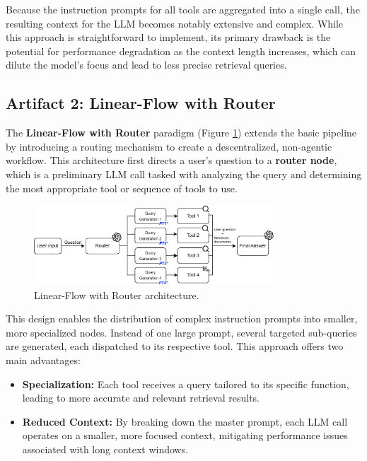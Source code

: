         Because the instruction prompts for all tools are aggregated into a single call, the resulting context for the LLM becomes notably extensive and complex. While this approach is straightforward to implement, its primary drawback is the potential for performance degradation as the context length increases, which can dilute the model's focus and lead to less precise retrieval queries.
        

    \subsection{Artifact 2: Linear-Flow with Router}
    
        The \textbf{Linear-Flow with Router} paradigm (Figure \ref{fig:diagrama_linear_w_router}) extends the basic pipeline by introducing a routing mechanism to create a descentralized, non-agentic workflow. This architecture first directs a user's question to a \textbf{router node}, which is a preliminary LLM call tasked with analyzing the query and determining the most appropriate tool or sequence of tools to use.

        \begin{figure}[h]
            \centering
            \includegraphics[width=0.8\textwidth]{images_exp2/diagrams/diagrama_linear_w_router.png}
            \caption{Linear-Flow with Router architecture.}
            \label{fig:diagrama_linear_w_router}
        \end{figure}

        This design enables the distribution of complex instruction prompts into smaller, more specialized nodes. Instead of one large prompt, several targeted sub-queries are generated, each dispatched to its respective tool. This approach offers two main advantages:

        \begin{itemize}
            \item \textbf{Specialization:} Each tool receives a query tailored to its specific function, leading to more accurate and relevant retrieval results.
            \item \textbf{Reduced Context:} By breaking down the master prompt, each LLM call operates on a smaller, more focused context, mitigating performance issues associated with long context windows.
        \end{itemize}


